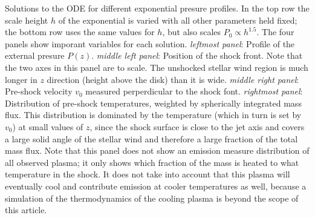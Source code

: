 \label{fig:p_ext}
Solutions to the ODE for different exponential presure profiles. In the top row the scale height $h$ of the exponential is varied with all other parameters held fixed; the bottom row uses the same values for $h$, but also scales $P_0\propto h^{1.5}$.
The four panels show imporant variables for each solution. \emph{leftmost panel}: Profile of the external presure $P(z)$. \emph{middle left panel}: Position of the shock front. Note that the two axes in this panel are to scale. The unshocked stellar wind region is much longer in $z$ direction (height above the disk) than it is wide. \emph{middle right panel}: Pre-shock velocity $v_0$ measured perperdicular to the shock font. \emph{rightmost panel}: Distribution of pre-shock temperatures, weighted by spherically integrated mass flux. This distribution is dominated by the temperature (which in turn is set by $v_0$) at small values of $z$, since the shock surface is close to the jet axis and covers a large solid angle of the stellar wind and therefore a large fraction of the total mass flux. Note that this panel does not show an emission measure distribution of all observed plasma; it only shows which fraction of the mass is heated to what temperature in the shock. It does not take into account that this plasma will eventually cool and contribute emission at cooler temperatures as well, because a simulation of the thermodynamics of the cooling plasma is beyond the scope of this article.